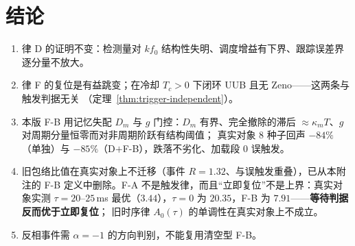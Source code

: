 \documentclass[11pt,a4paper]{article}
\theoremstyle{remark}
\begin{document}
\section{结论}
\begin{enumerate}
\item 律 D 的证明不变：检测量对 $k f_0$ 结构性失明、调度增益有下界、跟踪误差界逐分量不放大。
\item 律 F 的复位是有益跳变；在冷却 $T_c>0$ 下闭环 UUB 且无 Zeno——这两条与触发判据无关
      （定理~\ref{thm:trigger-independent}）。
\item 本版 F-B 用记忆失配 $D_m$ 与 $g$ 门控：$D_m$ 有界、完全撤除的滞后
      $\approx\kappa_m T$、$g$ 对周期分量恒零而对非周期阶跃有结构阈值；
      真实对象 8 种子回声 $-84\%$（单独）与 $-85\%$（D$+$F-B），跌落不劣化、加载段 0 误触发。
\item 旧包络比值在真实对象上不迁移（事件 $R=1.32$、与误触发重叠），已从本附注的 F-B
      定义中删除。F-A 不是触发律，而且“立即复位”不是上界：真实对象实测 $\tau=20$--$25$\,ms
      最优（$3.44$），$\tau=0$ 为 $20.35$，F-B 为 $7.91$——\textbf{等待判据反而优于立即复位}；
      旧时序律 $A_0(\tau)$ 的单调性在真实对象上不成立。
\item 反相事件需 $\alpha=-1$ 的方向判别，不能复用清空型 F-B。
\end{enumerate}
\end{document}
